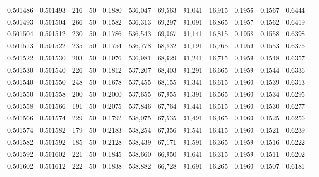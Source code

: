 \begin{tabular}{rrrrrrrrrrrrr}
0.501486 & 0.501493 & 216 &  50 &                                     0.1880 & 536,047 &  69,563 &  91,041 &  16,915 & 0.1956 & 0.1567 & 0.6444 \\
0.501493 & 0.501504 & 266 &  50 &                                     0.1582 & 536,313 &  69,297 &  91,091 &  16,865 & 0.1957 & 0.1562 & 0.6419 \\
0.501504 & 0.501512 & 230 &  50 &                                     0.1786 & 536,543 &  69,067 &  91,141 &  16,815 & 0.1958 & 0.1558 & 0.6398 \\
0.501513 & 0.501522 & 235 &  50 &                                     0.1754 & 536,778 &  68,832 &  91,191 &  16,765 & 0.1959 & 0.1553 & 0.6376 \\
0.501522 & 0.501530 & 203 &  50 &                                     0.1976 & 536,981 &  68,629 &  91,241 &  16,715 & 0.1959 & 0.1548 & 0.6357 \\
0.501530 & 0.501540 & 226 &  50 &                                     0.1812 & 537,207 &  68,403 &  91,291 &  16,665 & 0.1959 & 0.1544 & 0.6336 \\
0.501540 & 0.501550 & 248 &  50 &                                     0.1678 & 537,455 &  68,155 &  91,341 &  16,615 & 0.1960 & 0.1539 & 0.6313 \\
0.501550 & 0.501558 & 200 &  50 &                                     0.2000 & 537,655 &  67,955 &  91,391 &  16,565 & 0.1960 & 0.1534 & 0.6295 \\
0.501558 & 0.501566 & 191 &  50 &                                     0.2075 & 537,846 &  67,764 &  91,441 &  16,515 & 0.1960 & 0.1530 & 0.6277 \\
0.501566 & 0.501574 & 229 &  50 &                                     0.1792 & 538,075 &  67,535 &  91,491 &  16,465 & 0.1960 & 0.1525 & 0.6256 \\
0.501574 & 0.501582 & 179 &  50 &                                     0.2183 & 538,254 &  67,356 &  91,541 &  16,415 & 0.1960 & 0.1521 & 0.6239 \\
0.501582 & 0.501592 & 185 &  50 &                                     0.2128 & 538,439 &  67,171 &  91,591 &  16,365 & 0.1959 & 0.1516 & 0.6222 \\
0.501592 & 0.501602 & 221 &  50 &                                     0.1845 & 538,660 &  66,950 &  91,641 &  16,315 & 0.1959 & 0.1511 & 0.6202 \\
0.501602 & 0.501612 & 222 &  50 &                                     0.1838 & 538,882 &  66,728 &  91,691 &  16,265 & 0.1960 & 0.1507 & 0.6181 \\

\end{tabular}
